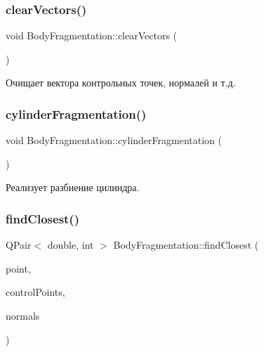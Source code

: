\subsubsection{\texorpdfstring{clear\+Vectors()}{clearVectors()}}
{\footnotesize\ttfamily void Body\+Fragmentation\+::clear\+Vectors (\begin{DoxyParamCaption}{ }\end{DoxyParamCaption})}

Очищает вектора контрольных точек, нормалей и т.\+д. \mbox{\label{class_body_fragmentation_aaa0982c352b4a4cc65ba7582cb4b0d9e}} 
\subsubsection{\texorpdfstring{cylinder\+Fragmentation()}{cylinderFragmentation()}}
{\footnotesize\ttfamily void Body\+Fragmentation\+::cylinder\+Fragmentation (\begin{DoxyParamCaption}{ }\end{DoxyParamCaption})}

Реализует разбиение цилиндра. \mbox{\label{class_body_fragmentation_a603a59196a3a1656c2d1b71014d68075}} 
\subsubsection{\texorpdfstring{find\+Closest()}{findClosest()}}
{\footnotesize\ttfamily Q\+Pair$<$ double, int $>$ Body\+Fragmentation\+::find\+Closest (\begin{DoxyParamCaption}\item[{const \mbox{\hyperlink{class_vector3_d}{Vector3D}}}]{point,  }\item[{const Q\+Vector$<$ \mbox{\hyperlink{class_vector3_d}{Vector3D}} $>$ \&}]{control\+Points,  }\item[{const Q\+Vector$<$ \mbox{\hyperlink{class_vector3_d}{Vector3D}} $>$ \&}]{normals }\end{DoxyParamCaption})\hspace{0.3cm}{\ttfamily [static]}}

